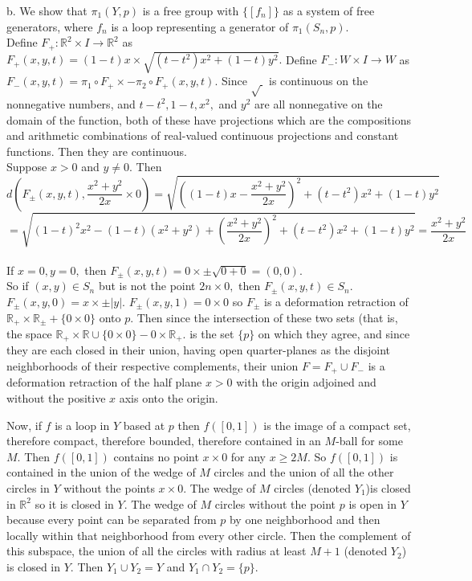\documentclass{article}
\begin{document}
b. We show that $\pi_1(Y,p)$ is a free group with $\{[f_n]\}$ as a system of free generators, where $f_n$ is a loop representing a generator of $\pi_1(S_n, p).$
\\
Define $F_+:\mathbb{R}^2\times I\to \mathbb{R}^2$ as $F_+(x,y,t)=(1-t)x\times\sqrt{(t-t^2)x^2+(1-t)y^2}.$  Define $F_-:W\times I\to W$ as $F_-(x,y,t)=\pi_1\circ F_+\times -\pi_2 \circ F_+(x,y,t).$
Since $\sqrt{\ }$ is continuous on the nonnegative numbers, and $t-t^2,1-t,x^2,$ and $y^2$ are all nonnegative on the domain of the function, both of these have projections which are the compositions and arithmetic combinations of real-valued continuous projections and constant functions.  Then they are continuous.
\\
Suppose $x>0$ and $y\ne 0.$  Then
$$
d(F_{\pm}(x,y,t),\frac{x^2+y^2}{2x}\times 0)=\sqrt{((1-t)x-\frac{x^2+y^2}{2x})^2+(t-t^2)x^2+(1-t)y^2}
$$$$
=\sqrt{(1-t)^2x^2-(1-t)(x^2+y^2)+(\frac{x^2+y^2}{2x})^2+(t-t^2)x^2+(1-t)y^2}
=\frac{x^2+y^2}{2x}
$$
\\
If $x=0,y=0,$ then $F_{\pm}(x,y,t)=0\times \pm\sqrt{0+0}=(0,0).$
\\
So if $(x,y)\in S_n$ but is not the point $2n\times 0,$ then $F_{\pm}(x,y,t)\in S_n.$
\\
$F_{\pm}(x,y,0)=x\times \pm |y|.$
$F_{\pm}(x,y,1)=0\times 0$ so $F_{\pm}$ is a deformation retraction of $\mathbb{R}_+\times \mathbb{R}_{\pm}+\{0\times 0\}$ onto $p.$  Then since the intersection of these two sets (that is, the space $\mathbb{R}_+\times \mathbb{R}\cup\{0\times 0\}-0\times\mathbb{R}_+.$ is the set $\{p\}$ on which they agree, and since they are each closed in their union, having open quarter-planes as the disjoint neighborhoods of their respective complements, their union $F=F_+\cup F_-$ is a deformation retraction of the half plane $x>0$ with the origin adjoined and without the positive $x$ axis onto the origin.

Now, if $f$ is a loop in $Y$ based at $p$ then $f([0,1])$ is the image of a compact set, therefore compact, therefore bounded, therefore contained in an $M$-ball  for some $M.$  Then $f([0,1])$ contains no point $x\times 0$ for any $x\ge 2M.$  So $f([0,1])$ is contained in the union of the wedge of $M$ circles and the union of all the other circles in $Y$ without the points $x\times 0.$  The wedge of $M$ circles (denoted $Y_1$)is closed in $\mathbb{R}^2$ so it is closed in $Y.$  The wedge of $M$ circles without the point $p$ is open in $Y$ because every point can be separated from $p$ by one neighborhood and then locally within that neighborhood from every other circle.  Then the complement of this subspace, the union of all the circles with radius at least $M+1$ (denoted $Y_2$) is closed in $Y.$  Then $Y_1\cup Y_2=Y$ and $Y_1\cap Y_2=\{p\}.$
\end{document}
